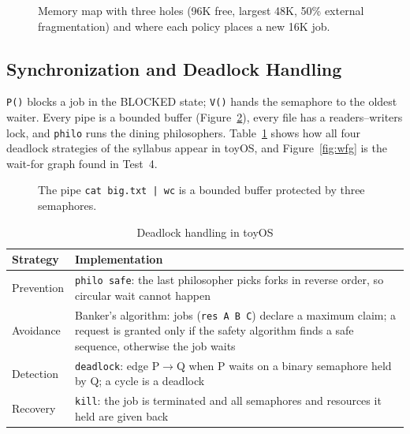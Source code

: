\documentclass[12pt,a4paper]{article}
\begin{document}
\begin{figure}[H]
\centering
{}
\caption{Memory map with three holes (96K free, largest 48K, 50\% external fragmentation) and where each policy places a new 16K job.}
\label{fig:mem}
\end{figure}

\subsection{Synchronization and Deadlock Handling}

\texttt{P()} blocks a job in the BLOCKED state; \texttt{V()} hands the semaphore to the oldest waiter. Every pipe is a bounded buffer (Figure~\ref{fig:pipe}), every file has a readers--writers lock, and \texttt{philo} runs the dining philosophers. Table~\ref{tab:dl} shows how all four deadlock strategies of the syllabus appear in toyOS, and Figure~\ref{fig:wfg} is the wait-for graph found in Test~4.

\begin{figure}[H]
\centering

\caption{The pipe \texttt{cat big.txt | wc} is a bounded buffer protected by three semaphores.}
\label{fig:pipe}
\end{figure}

\begin{table}[H]
\centering
\caption{Deadlock handling in toyOS}
\label{tab:dl}
\small
\begin{tabularx}{\textwidth}{@{}l>{\raggedright\arraybackslash}X@{}}
\toprule
\textbf{Strategy} & \textbf{Implementation} \\
\midrule
Prevention & \texttt{philo safe}: the last philosopher picks forks in reverse order, so circular wait cannot happen \\
Avoidance & Banker's algorithm: jobs (\texttt{res A B C}) declare a maximum claim; a request is granted only if the safety algorithm finds a safe sequence, otherwise the job waits \\
Detection & \texttt{deadlock}: edge P$\rightarrow$Q when P waits on a binary semaphore held by Q; a cycle is a deadlock \\
Recovery & \texttt{kill}: the job is terminated and all semaphores and resources it held are given back \\
\bottomrule
\end{tabularx}
\end{table}
\end{document}
